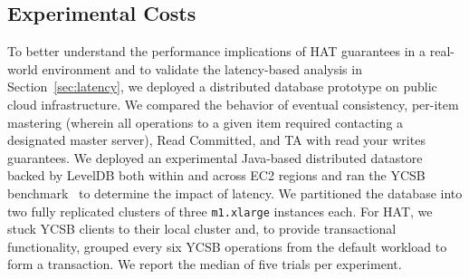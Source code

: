 \subsection{Experimental Costs}

To better understand the performance implications of HAT guarantees in
a real-world environment and to validate the latency-based analysis in
Section~\ref{sec:latency}, we deployed a distributed database
prototype on public cloud infrastructure. We compared the behavior of
eventual consistency, per-item mastering (wherein all operations to a
given item required contacting a designated master server), Read
Committed, and TA with read your writes guarantees. We deployed an
experimental Java-based distributed datastore backed by LevelDB both
within and across EC2 regions and ran the YCSB benchmark~\cite{ycsb}
to determine the impact of latency. We partitioned the database into
two fully replicated clusters of three \texttt{m1.xlarge} instances
each. For HAT, we stuck YCSB clients to their local cluster and, to
provide transactional functionality, grouped every six YCSB operations
from the default workload to form a transaction. We report the median
of five trials per experiment.

